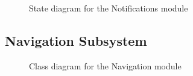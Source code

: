 \documentclass{article}
\begin{document}
			\begin{figure}[H]
			
				\caption{State diagram for the Notifications module}
			
			\end{figure}
	
		\subsection{Navigation Subsystem}
		
			\begin{figure}[H]
				
				\caption{Class diagram for the Navigation module}
				
			\end{figure}		
			
\end{document}
